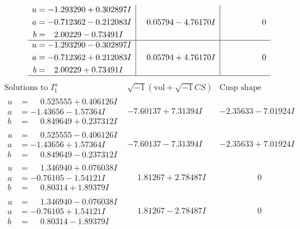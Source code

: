 \documentclass[1p]{elsarticle_modified}
\theoremstyle{definition}
\newcommand{\I}{\sqrt{-1}}
\begin{document}
$$\begin{array}{c|c|c}
\begin{aligned}
u &= -1.293290 + 0.302897 I \\
a &= -0.712362 - 0.212083 I \\
b &= \phantom{-}2.00229 - 0.73491 I\end{aligned}
 & \phantom{-}0.05794 - 4.76170 I & \phantom{-0.000000 } 0 \\ \hline\begin{aligned}
u &= -1.293290 - 0.302897 I \\
a &= -0.712362 + 0.212083 I \\
b &= \phantom{-}2.00229 + 0.73491 I\end{aligned}
 & \phantom{-}0.05794 + 4.76170 I & \phantom{-0.000000 } 0\\
 \hline 
 \end{array}$$\newpage$$\begin{array}{c|c|c}  
\text{Solutions to }I^u_{1}& \I (\text{vol} + \sqrt{-1}CS) & \text{Cusp shape}\\
 \hline 
\begin{aligned}
u &= \phantom{-}0.525555 + 0.406126 I \\
a &= -1.43656 - 1.57364 I \\
b &= \phantom{-}0.849649 + 0.237312 I\end{aligned}
 & -7.60137 + 7.31394 I & -2.35633 - 7.01924 I \\ \hline\begin{aligned}
u &= \phantom{-}0.525555 - 0.406126 I \\
a &= -1.43656 + 1.57364 I \\
b &= \phantom{-}0.849649 - 0.237312 I\end{aligned}
 & -7.60137 - 7.31394 I & -2.35633 + 7.01924 I \\ \hline\begin{aligned}
u &= \phantom{-}1.346940 + 0.076038 I \\
a &= -0.76105 - 1.54121 I \\
b &= \phantom{-}0.80314 + 1.89379 I\end{aligned}
 & \phantom{-}1.81267 + 2.78487 I & \phantom{-0.000000 } 0 \\ \hline\begin{aligned}
u &= \phantom{-}1.346940 - 0.076038 I \\
a &= -0.76105 + 1.54121 I \\
b &= \phantom{-}0.80314 - 1.89379 I\end{aligned}
 & \phantom{-}1.81267 - 2.78487 I & \phantom{-0.000000 } 0 \\ \hline\begin{aligned}

\end{aligned}
\end{array}$$
\end{document}
